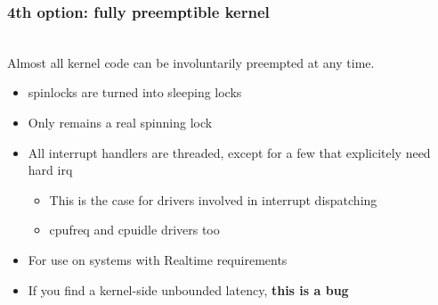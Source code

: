 \begin{frame}
        \frametitle{4th option: fully preemptible kernel}
          \\
          Almost all kernel code can be involuntarily preempted at any time.
          \begin{itemize}
          \item spinlocks are turned into sleeping locks
          \item Only  remains a real spinning lock
          \item All interrupt handlers are threaded, except for a few that explicitely need hard irq
                  \begin{itemize}
                          \item This is the case for drivers involved in interrupt dispatching
                          \item cpufreq and cpuidle drivers too
                  \end{itemize}
          \item For use on systems with Realtime requirements
          \item If you find a kernel-side unbounded latency, \textbf{this is a bug}
          \end{itemize}
\end{frame}

